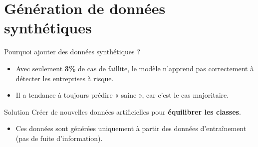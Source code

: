 \documentclass[10pt,aspectratio=169]{beamer}
\begin{document}
\section{Génération de données synthétiques}

\begin{frame}{Pourquoi ajouter des données synthétiques ?}
  \begin{itemize}
    \item Avec seulement \textbf{3\%} de cas de faillite, le modèle
          n'apprend pas correctement à détecter les entreprises à risque.
    \pause
    \item Il a tendance à toujours prédire « saine », car c'est le cas
          majoritaire.
    \pause
  \end{itemize}
  \begin{alertblock}{Solution}
    Créer de nouvelles données artificielles pour \textbf{équilibrer les
    classes}.
  \end{alertblock}
  \pause
  \begin{itemize}
    \item Ces données sont générées \alert{uniquement à partir des
          données d'entraînement} (pas de fuite d'information).
  \end{itemize}
\end{frame}
\end{document}
